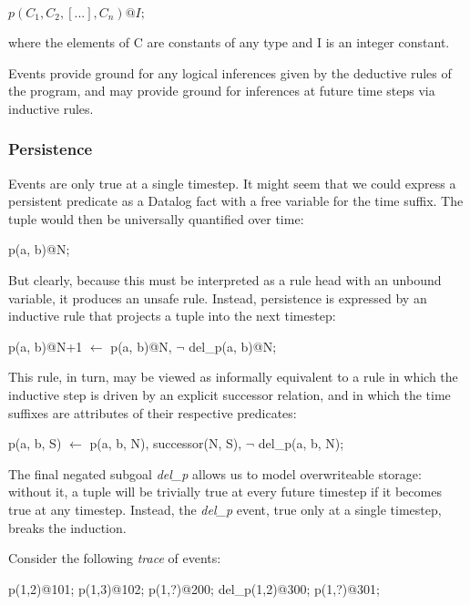 $p(C_{1},C_{2},[...],C_{n})@I;$


where the elements of C are constants of any type and I is an integer constant.

Events provide ground for any logical inferences given by the deductive rules of the program, and may provide ground for inferences at 
future time steps via inductive rules.

\subsubsection{Persistence}

Events are only true at a single timestep.  It might seem that we could express a persistent predicate as a Datalog fact with a free variable 
for the time suffix.  The tuple would then be universally quantified over time:

\begin{Dedalus}
p(a, b)@N;
\end{Dedalus}

But clearly, because this must be interpreted as a rule head with an unbound variable, it produces an unsafe rule.  Instead, persistence is
expressed by an inductive rule that projects a tuple into the next timestep:

\begin{Dedalus}
p(a, b)@N+1 \(\leftarrow\)
  p(a, b)@N, 
  \(\lnot\) del\_p(a, b)@N;
\end{Dedalus}

This rule, in turn, may be viewed as informally equivalent to a rule in which the inductive step is driven by an 
explicit successor relation, and in which the time suffixes are attributes of their respective predicates:

\begin{Dedalus}
p(a, b, S) \(\leftarrow\)
  p(a, b, N),
  successor(N, S), 
  \(\lnot\) del\_p(a, b, N);
\end{Dedalus}

The final negated subgoal \emph{del\_p} allows us to model overwriteable storage: without it, a tuple will be trivially true at every future timestep if it becomes true
at any timestep.  Instead, the \emph{del\_p} event, true only at a single timestep, breaks the induction.

Consider the following {\em trace} of events:

\begin{Dedalus}
p(1,2)@101;
p(1,3)@102;
p(1,?)@200;
del_p(1,2)@300;
p(1,?)@301;
\end{Dedalus}

